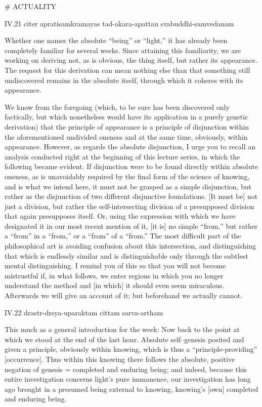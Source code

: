 # ACTUALITY

IV.21
citer apratisamkramayas tad-akara-apattau svabuddhi-samvedanam

Whether one names the absolute “being” or “light,”
it has already been completely familiar for several weeks.
Since attaining this familiarity, we are working on
deriving not, as is obvious, the thing itself,
but rather its appearance.
The request for this derivation can mean nothing else than
that something still undiscovered remains in the absolute itself,
through which it coheres with its appearance.

We know from the foregoing
(which, to be sure has been discovered only factically,
but which nonetheless would have its application
in a purely genetic derivation)
that the principle of appearance is
a principle of disjunction
within the aforementioned undivided oneness
and at the same time, obviously, within appearance.
However, as regards the absolute disjunction,
I urge you to recall an analysis conducted right at
the beginning of this lecture series,
in which the following became evident.
If disjunction were to be found
directly within absolute oneness,
as is unavoidably required by
the final form of the science of knowing,
and is what we intend here,
it must not be grasped as a simple disjunction,
but rather as the disjunction of
two different disjunctive foundations.
[It must be] not just a division,
but rather the self-intersecting division
of a presupposed division that again presupposes itself.
Or, using the expression with which we have designated it
in our most recent mention of it,
[it is] no simple “from,”
but rather a “from” in a “from,”
or a “from” of a “from.”
The most difficult part of the philosophical art is
avoiding confusion about this intersection,
and distinguishing that which is endlessly similar
and is distinguishable only through the subtlest mental distinguishing.
I remind you of this so that you will not become mistrustful
if, in what follows, we enter regions
in which you no longer understand the method
and [in which] it should even seem miraculous.
Afterwards we will give an account of it;
but beforehand we actually cannot.

IV.22
drastr-drsya-uparaktam cittam sarva-artham

This much as a general introduction for the week:
Now back to the point at which we stood at the end of the last hour.
Absolute self–genesis posited and given a principle,
obviously within knowing,
which is thus a “principle-providing” [occurrence].
Thus within this knowing there follows
the absolute, positive negation of genesis =
completed and enduring being;
and indeed, because this entire investigation
concerns light’s pure immanence,
our investigation has long ago brought in
a presumed being external to knowing,
knowing’s [own] completed and enduring being.

